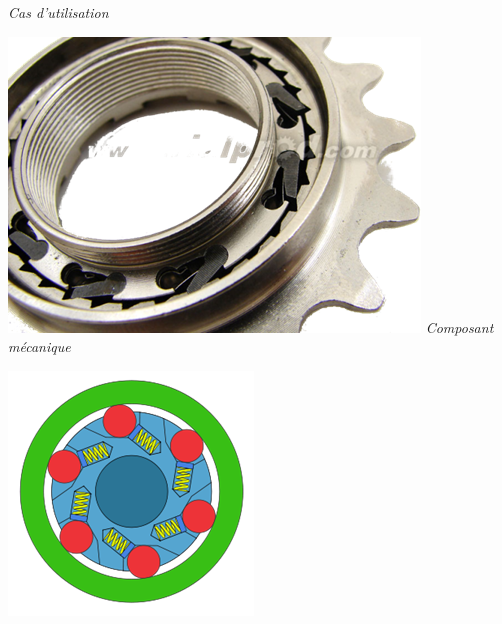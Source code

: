 \documentclass[11pt,oneside]{article}
\begin{document}
\begin{center}
\hfill
\begin{minipage}[c]{.21\linewidth}
\begin{center}
\textit{Cas d'utilisation}
\end{center}
\end{minipage} \hfill
\begin{minipage}[c]{.21\linewidth}
\begin{center}
\includegraphics[width=.9\textwidth]{png/roue_1}
\textit{Composant mécanique \cite{roue1}}
\end{center}
\end{minipage} \hfill
\begin{minipage}[c]{.21\linewidth}
\begin{center}
\includegraphics[width=.9\textwidth]{png/roue_2}

\end{center}
\end{minipage}
\end{center}
\end{document}
